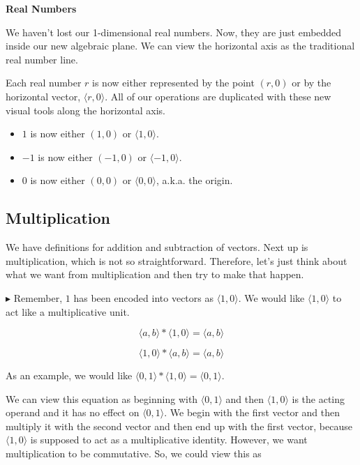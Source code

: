 \documentclass{ximera}
\begin{document}
\textbf{Real Numbers}



We haven't lost our 1-dimensional real numbers. Now, they are just embedded inside our new algebraic plane.  We can view the horizontal axis as the traditional real number line.

Each real number $r$ is now either represented by the point $(r,0)$ or by the horizontal vector, $\langle r, 0 \rangle$.  All of our operations are duplicated with these new visual tools along the horizontal axis.


\begin{itemize}
\item $1$ is now either $(1,0)$ or $\langle 1, 0 \rangle$.
\item $-1$ is now either $(-1,0)$ or $\langle -1, 0 \rangle$.
\item $0$ is now either $(0,0)$ or $\langle 0, 0 \rangle$, a.k.a. the origin.
\end{itemize}














\subsection*{Multiplication}



We have definitions for addition and subtraction of vectors.  Next up is multiplication, which is not so straightforward.  Therefore, let's just think about what we want from multiplication and then try to make that happen.

\textbf{\textcolor{red!90!darkgray}{$\blacktriangleright$}} Remember, $1$ has been encoded into vectors as $\langle 1, 0 \rangle$.  We would like $\langle 1, 0 \rangle$ to act like a multiplicative unit.

\[    \langle a, b \rangle * \langle 1, 0 \rangle    = \langle a, b \rangle            \]

\[    \langle 1, 0 \rangle * \langle a, b \rangle    = \langle a, b \rangle            \]


As an example, we would like $\langle 0, 1 \rangle * \langle 1, 0 \rangle    = \langle 0, 1 \rangle $.

We can view this equation as beginning with $\langle 0, 1 \rangle$ and then $\langle 1, 0 \rangle$ is the acting operand and it has no effect on $\langle 0, 1 \rangle$.  We begin with the first vector and then multiply it with the second vector and then end up with the first vector, because $\langle 1, 0 \rangle$ is supposed to act as a multiplicative identity. However, we want multiplication to be commutative.  So, we could view this as 
\end{document}
